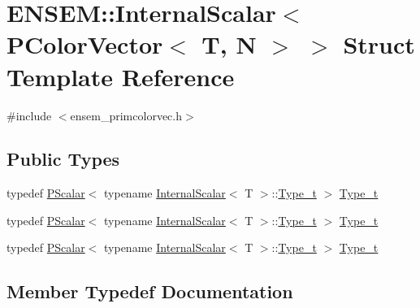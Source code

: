 \hypertarget{structENSEM_1_1InternalScalar_3_01PColorVector_3_01T_00_01N_01_4_01_4}{}\section{E\+N\+S\+EM\+:\+:Internal\+Scalar$<$ P\+Color\+Vector$<$ T, N $>$ $>$ Struct Template Reference}
\label{structENSEM_1_1InternalScalar_3_01PColorVector_3_01T_00_01N_01_4_01_4}


{\ttfamily \#include $<$ensem\+\_\+primcolorvec.\+h$>$}

\subsection*{Public Types}
\begin{DoxyCompactItemize}
\item 
typedef \mbox{\hyperlink{classENSEM_1_1PScalar}{P\+Scalar}}$<$ typename \mbox{\hyperlink{structENSEM_1_1InternalScalar}{Internal\+Scalar}}$<$ T $>$\+::\mbox{\hyperlink{structENSEM_1_1InternalScalar_3_01PColorVector_3_01T_00_01N_01_4_01_4_a24a574d9378f5b76122d29737f62fbfd}{Type\+\_\+t}} $>$ \mbox{\hyperlink{structENSEM_1_1InternalScalar_3_01PColorVector_3_01T_00_01N_01_4_01_4_a24a574d9378f5b76122d29737f62fbfd}{Type\+\_\+t}}
\item 
typedef \mbox{\hyperlink{classENSEM_1_1PScalar}{P\+Scalar}}$<$ typename \mbox{\hyperlink{structENSEM_1_1InternalScalar}{Internal\+Scalar}}$<$ T $>$\+::\mbox{\hyperlink{structENSEM_1_1InternalScalar_3_01PColorVector_3_01T_00_01N_01_4_01_4_a24a574d9378f5b76122d29737f62fbfd}{Type\+\_\+t}} $>$ \mbox{\hyperlink{structENSEM_1_1InternalScalar_3_01PColorVector_3_01T_00_01N_01_4_01_4_a24a574d9378f5b76122d29737f62fbfd}{Type\+\_\+t}}
\item 
typedef \mbox{\hyperlink{classENSEM_1_1PScalar}{P\+Scalar}}$<$ typename \mbox{\hyperlink{structENSEM_1_1InternalScalar}{Internal\+Scalar}}$<$ T $>$\+::\mbox{\hyperlink{structENSEM_1_1InternalScalar_3_01PColorVector_3_01T_00_01N_01_4_01_4_a24a574d9378f5b76122d29737f62fbfd}{Type\+\_\+t}} $>$ \mbox{\hyperlink{structENSEM_1_1InternalScalar_3_01PColorVector_3_01T_00_01N_01_4_01_4_a24a574d9378f5b76122d29737f62fbfd}{Type\+\_\+t}}
\end{DoxyCompactItemize}


\subsection{Member Typedef Documentation}
\mbox{\label{structENSEM_1_1InternalScalar_3_01PColorVector_3_01T_00_01N_01_4_01_4_a24a574d9378f5b76122d29737f62fbfd}} 
